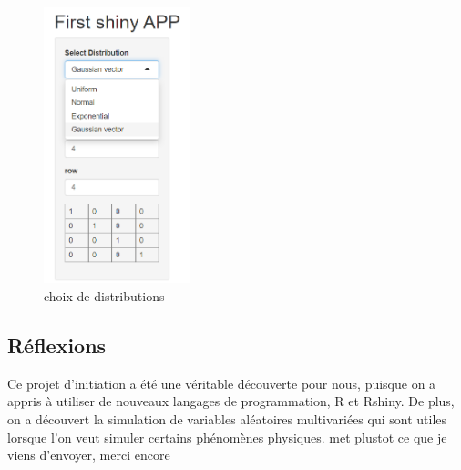 \documentclass[10pt]{article} %
\begin{document}
\begin{figure}[h!]
\centering
\includegraphics[height=8cm]{media/apppic2.png}
\caption{choix de distributions}
\end{figure}


\subsection{Réflexions}

Ce projet d'initiation a été une véritable découverte pour nous, puisque on a appris à utiliser de nouveaux langages de programmation, R et Rshiny. De plus, on a découvert la simulation de variables aléatoires multivariées qui sont utiles lorsque l'on veut simuler certains phénomènes physiques.
met plustot ce que je viens d'envoyer, merci encore
\end{document}
